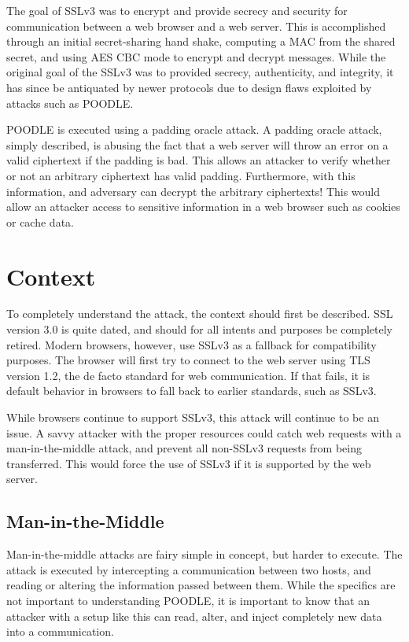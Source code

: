 \documentclass[10pt]{article}
\begin{document}
The goal of SSLv3 was to encrypt and provide secrecy and security for
communication between a web browser and a web server. This is accomplished
through an initial secret-sharing hand shake, computing a MAC from the shared
secret, and using AES CBC mode to encrypt and decrypt messages.\cite{SSLv3}
While the original goal of the SSLv3 was to provided secrecy, authenticity, and
integrity, it has since be antiquated by newer protocols due to design flaws
exploited by attacks such as POODLE.

POODLE is executed using a padding oracle attack. A padding oracle attack, simply
described, is abusing the fact that a web server will throw an error on a valid
ciphertext if the padding is bad. This allows an attacker to verify whether or
not an arbitrary ciphertext has valid padding. Furthermore, with this information,
and adversary can decrypt the arbitrary ciphertexts!\cite{rosulek} This would
allow an attacker access to sensitive information in a web browser such as
cookies or cache data.

\section*{Context}
To completely understand the attack, the context should first be described.
SSL version 3.0 is quite dated, and should for all intents and purposes be 
completely retired. Modern browsers, however, use SSLv3 as a fallback for
compatibility purposes. The browser will first try to connect to the web server
using TLS version 1.2, the de facto standard for web communication. If that fails,
it is default behavior in browsers to fall back to earlier standards, such as SSLv3.\cite{POODLE}

While browsers continue to support SSLv3, this attack will continue to be an
issue. A savvy attacker with the proper resources could catch web requests with
a man-in-the-middle attack, and prevent all non-SSLv3 requests from being transferred.
This would force the use of SSLv3 if it is supported by the web server.\cite{MozillaPOODLE}

\subsection*{Man-in-the-Middle}
Man-in-the-middle attacks are fairy simple in concept, but harder to execute.
The attack is executed by intercepting a communication between two hosts, and
reading or altering the information passed between them.\cite{mttm} While the
specifics are not important to understanding POODLE, it is important to know
that an attacker with a setup like this can read, alter, and inject completely
new data into a communication.
\end{document}
